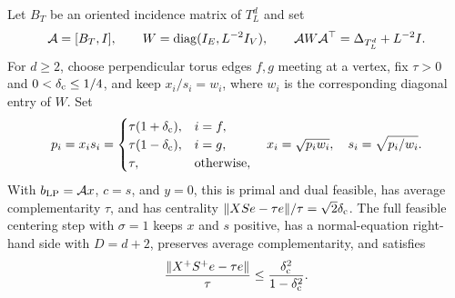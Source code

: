 \begin{proposition}
\label{prop:torus-feasible-corrector}
Let $B_T$ be an oriented incidence matrix of $T_L^d$ and set
\begin{equation}
 \mathcal A=[B_T,I],\qquad
 W=\operatorname{diag}(I_E,L^{-2}I_V),\qquad
 \mathcal A W\mathcal A^\top=\Delta_{T_L^d}+L^{-2}I.
 \label{eq:torus-ipm-factor}
\end{equation}
For $d\geq2$, choose perpendicular torus edges $f,g$ meeting at a vertex,
fix $\tau>0$ and $0<\delta_{\rm c}\leq1/4$, and keep $x_i/s_i=w_i$, where
$w_i$ is the corresponding diagonal entry of $W$.  Set
\begin{equation}
 p_i=x_is_i=
 \begin{cases}
  \tau(1+\delta_{\rm c}),&i=f,\\
  \tau(1-\delta_{\rm c}),&i=g,\\
  \tau,&\text{otherwise},
 \end{cases}
 \quad
 x_i=\sqrt{p_iw_i},\quad s_i=\sqrt{p_i/w_i}.
 \label{eq:torus-perturbed-products}
\end{equation}
With $b_{\rm LP}=\mathcal Ax$, $c=s$, and $y=0$, this is primal and dual
feasible, has average complementarity $\tau$, and has centrality
$\lVert XSe-\tau e\rVert/\tau=\sqrt2\delta_{\rm c}$.  The full feasible centering
step with $\sigma=1$ keeps $x$ and $s$ positive, has a normal-equation
right-hand side with $D=d+2$, preserves average complementarity, and
satisfies
\begin{equation}
 \frac{\lVert X^+S^+e-\tau e\rVert}\tau
 \leq\frac{\delta_{\rm c}^2}{1-\delta_{\rm c}^2}.
 \label{eq:torus-quadratic-centering}
\end{equation}
\end{proposition}

